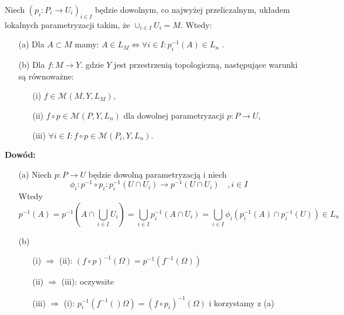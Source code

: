 \begin{tw}
	Niech $(p_i: P_i \rightarrow U_i)_{i \in I}$ będzie dowolnym, co najwyżej przeliczalnym, układem lokalnych parametryzacji takim, że $\cup_{i \in I} U_i = M$. Wtedy:
	\begin{enumerate}
		\item[(a)] Dla $A \subset M$ mamy: $A \in L_M \Leftrightarrow \forall i \in I: p_i^{-1}(A) \in L_n$ .
		\item[(b)] Dla $f: M \rightarrow Y$. gdzie $Y$ jest przestrzenią topologiczną, następujące warunki są równoważne:
			\begin{enumerate}
				\item[(i)] $f \in \mathcal{M}(M, Y, L_M)$,
				\item[(ii)] $f \circ p \in \mathcal{M}(P, Y, L_n)$ dla dowolnej parametryzacji $p: P \rightarrow U$,
				\item[(iii)] $\forall i \in I: f \circ p \in \mathcal{M}(P_i, Y, L_n)$.
			\end{enumerate}
	\end{enumerate}
	\textbf{Dowód:}
	\begin{enumerate}
		\item[(a)] Niech $p: P \rightarrow U$ będzie dowolną parametryzacją i niech 
		$$
			\phi_i: p^{-1} \circ p_i: p^{-1}_i(U \cap U_i) \rightarrow p^{-1}(U \cap U_i) \quad , i \in I
		$$
		Wtedy 
		$$
			p^{-1}(A) = p^{-1}(A \cap \bigcup_{i\in I} U_i) = \bigcup_{i \in I} p^{-1}_i(A \cap U_i) = \bigcup_{i \in I} \phi_i(p_i^{-1}(A) \cap p_i^{-1}(U)) \in L_n
		$$ 
		\item[(b)]
			\begin{enumerate} 
				\item[(i)] $\Longrightarrow$ (ii): $(f \circ p)^{-1}(\Omega) = p^{-1}(f^{-1}(\Omega))$ 
				\item[(ii)] $\Longrightarrow$ (iii): oczywsite
				\item[(iii)] $\Longrightarrow$ (i): $p_i^{-1}(f^{-1}()\Omega) = (f \circ p_i)^{-1}(\Omega)$ i korzystamy z (a)
			\end{enumerate}
	\end{enumerate}
\end{tw}